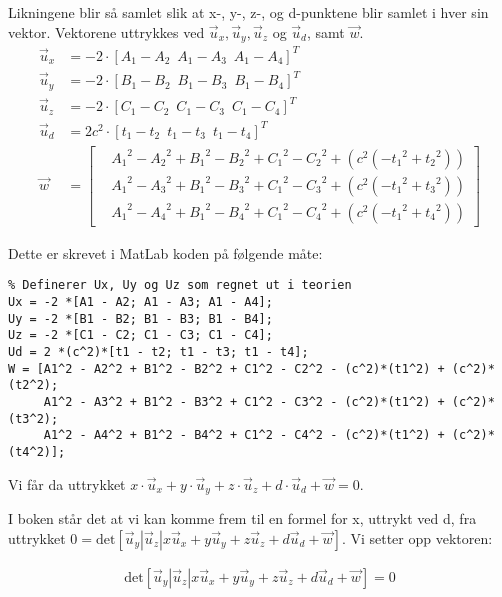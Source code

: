 Likningene blir så samlet slik at x-, y-, z-, og d-punktene blir samlet i hver sin vektor. Vektorene uttrykkes ved ${\vec u_x}, {\vec u_y}, {\vec u_z}$ og  ${\vec u_d}$, samt $\vec{w}$. 
\begin{align}
	{\vec u_x} &=  - 2\cdot[{A_1} - {A_2} \enspace {A_1} - {A_3}  \enspace{A_1} - {A_4}]^T \nonumber \\
	{\vec u_y} &=  - 2\cdot[{B_1} - {B_2}  \enspace{B_1} - {B_3}  \enspace{B_1} - {B_4}]^T \nonumber \\
	{\vec u_z} &=  - 2\cdot[{C_1} - {C_2}  \enspace{C_1} - {C_3}  \enspace{C_1} - {C_4}]^T \nonumber \\
	{\vec u_d} &=  2c^2\cdot[{t_1} - {t_2}  \enspace{t_1} - {t_3}  \enspace{t_1} - {t_4}]^T \nonumber \\
	{\vec w}  &= 
	\begin{bmatrix}
		&{A_1}^2 - {A_2}^2 + {B_1}^2 - {B_2}^2 + {C_1}^2 - {C_2}^2 + ({c^2}( - {t_1}^2 + {t_2}^2)) \\
		&{A_1}^2 - {A_3}^2 + {B_1}^2 - {B_3}^2 + {C_1}^2 - {C_3}^2 + ({c^2}( - {t_1}^2 + {t_3}^2)) \\ 
		&{A_1}^2 - {A_4}^2 + {B_1}^2 - {B_4}^2 + {C_1}^2 - {C_4}^2 + ({c^2}( - {t_1}^2 + {t_4}^2))
	\end{bmatrix}\nonumber
\end{align}

Dette er skrevet i MatLab koden på følgende måte: 

\begin{lstlisting}
% Definerer Ux, Uy og Uz som regnet ut i teorien 
Ux = -2 *[A1 - A2; A1 - A3; A1 - A4];
Uy = -2 *[B1 - B2; B1 - B3; B1 - B4];
Uz = -2 *[C1 - C2; C1 - C3; C1 - C4];
Ud = 2 *(c^2)*[t1 - t2; t1 - t3; t1 - t4];
W = [A1^2 - A2^2 + B1^2 - B2^2 + C1^2 - C2^2 - (c^2)*(t1^2) + (c^2)*(t2^2); 
     A1^2 - A3^2 + B1^2 - B3^2 + C1^2 - C3^2 - (c^2)*(t1^2) + (c^2)*(t3^2); 
     A1^2 - A4^2 + B1^2 - B4^2 + C1^2 - C4^2 - (c^2)*(t1^2) + (c^2)*(t4^2)];
\end{lstlisting}

Vi får da uttrykket $x\cdot{\vec u_x} + y\cdot{\vec u_y} + z\cdot{\vec u_z} + d\cdot{\vec u_d} + {\vec w} = 0$. 


I boken står det at vi kan komme frem til en formel for x, uttrykt ved d, fra uttrykket $0=\text{det}[\vec{u}_y | \vec{u}_z | x\vec{u}_x + y\vec{u}_y + z\vec{u}_z + d\vec{u}_d + \vec{w}]$. Vi setter opp vektoren: 

\begin{align} \label{eq:detx}
	\text{det}[\vec{u}_y|\vec{u}_z |x\vec{u}_x + y\vec{u}_y + z\vec{u}_z + d\vec{u}_d + \vec{w}]=0
\end{align}

